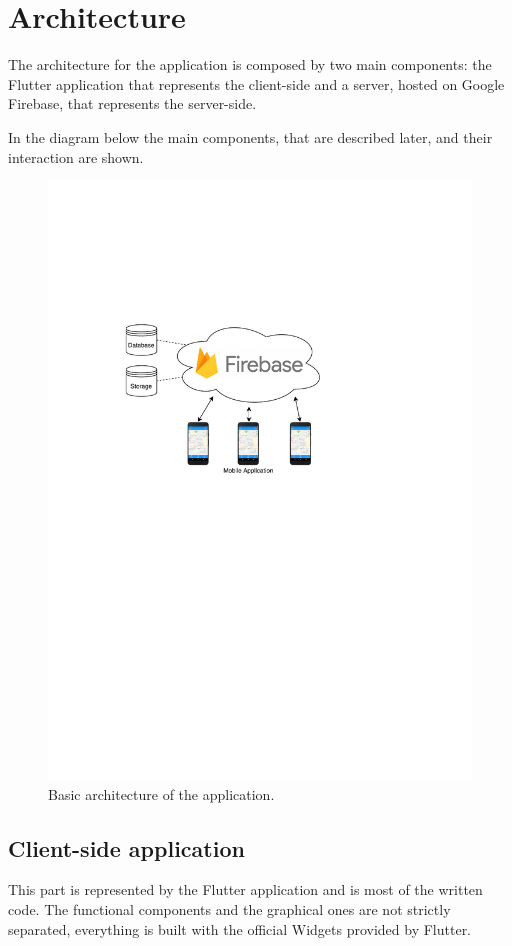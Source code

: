 \chapter{Architecture}%
\label{chap:architecture}
The architecture for the application is composed by two main components: the Flutter application that represents the client-side and a server, hosted on Google Firebase, that represents the server-side.

In the diagram below the main components, that are described later,  and their interaction are shown.

\begin{figure}[htpb]
	\centering
	\includegraphics[width=0.9\linewidth]{Pics/architecture2.pdf}
	\caption{Basic architecture of the application.}%
	\label{fig:Pics/architecture}
\end{figure}

\section{Client-side application}
This part is represented by the Flutter application and is most of the written code. The functional components and the graphical ones are not strictly separated, everything is built with the official Widgets provided by Flutter. 

